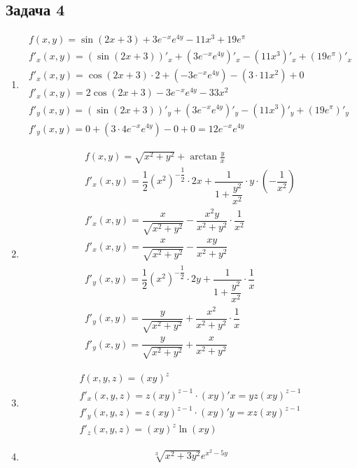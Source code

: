 \documentclass[a4paper,fleqn,12pt]{article}
\theoremstyle{definition}
\begin{document}
\subsection*{Задача 4}
\begin{enumerate}
\item 
\begin{gather*}
f(x,y) = \sin{(2x+3)} + 3e^{-x}e^{4y} - 11x^3 + 19e^\pi \\
f'_x(x,y) = (\sin{(2x+3)})'_x + (3e^{-x}e^{4y})'_x - (11x^3)'_x + (19e^\pi )'_x \\
f'_x(x,y) = \cos{(2x+3)}\cdot 2 + (-3e^{-x}e^{4y}) - (3 \cdot 11x^2) + 0 \\
f'_x(x,y) = 2\cos{(2x+3)} -3e^{-x}e^{4y} - 33x^2 \\
f'_y(x,y) = (\sin{(2x+3)})'_y + (3e^{-x}e^{4y})'_y - (11x^3)'_y + (19e^\pi )'_y \\
f'_y(x,y) = 0 + (3 \cdot 4 e^{-x}e^{4y}) - 0 + 0 = 12e^{-x}e^{4y}
\end{gather*}
\item 
\begin{gather*}
f(x,y) = \sqrt{x^2 + y^2} + \arctan {\frac{y}{x}}\\
f'_x(x,y) = \dfrac{1}{2} (x^2)^{- \dfrac{1}{2}} \cdot 2x + \dfrac{1}{1 + \dfrac{y^2}{x^2}} \cdot y \cdot ( - \dfrac{1}{x^2}) \\
f'_x(x,y) = \dfrac{x}{\sqrt{x^2 + y^2}} - \dfrac{x^2y}{x^2 + y^2} \cdot \dfrac{1}{x^2} \\
f'_x(x,y) = \dfrac{x}{\sqrt{x^2 + y^2}} - \dfrac{xy}{x^2 + y^2} \\
f'_y(x,y) = \dfrac{1}{2} (x^2)^{- \dfrac{1}{2}} \cdot 2y + \dfrac{1}{1 + \dfrac{y^2}{x^2}} \cdot  \dfrac{1}{x} \\
f'_y(x,y) = \dfrac{y}{\sqrt{x^2 + y^2}} + \dfrac{x^2}{x^2 + y^2} \cdot \dfrac{1}{x}\\
f'_y(x,y) = \dfrac{y}{\sqrt{x^2 + y^2}} + \dfrac{x}{x^2 + y^2}
\end{gather*}
\item 
\begin{gather*}
f(x,y,z) = (xy)^z\\
f'_x(x,y,z) = z(xy)^{z-1} \cdot (xy)'x = yz(xy)^{z-1}\\
f'_y(x,y,z) = z(xy)^{z-1} \cdot (xy)'y = xz(xy)^{z-1}\\
f'_z(x,y,z) = (xy)^z \ln{(xy)}
\end{gather*}
\item 
\begin{gather*}
\sqrt[3]{x^2+3y^2} e^{x^2 - 5y}\\

\end{gather*}
\end{enumerate}
\end{document}
